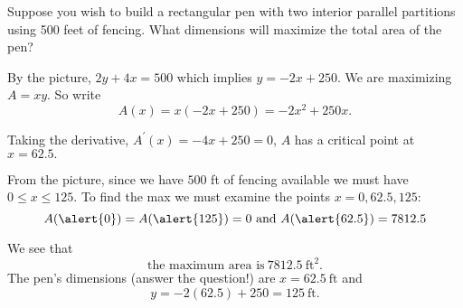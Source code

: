 \documentclass[14pt]{beamer}
\begin{document}
\begin{frame}
\frametitle{}
\small
\begin{exe} Suppose you wish to build a rectangular pen with two interior parallel partitions using 500 feet of fencing.  What dimensions will maximize the total area of the pen?
\begin{center}
\end{center}
\end{exe}
\end{frame}

\begin{frame}
\small
By the picture, $2y+4x=500$ which implies $y=-2x+250$.  We are maximizing $A=xy$.  So write
\[A(x)=x(-2x+250)=-2x^2+250x.\]

Taking the derivative, $A^{\prime}(x)=-4x+250=0$, $A$ has a critical point at $x=62.5.$
\end{frame}

\begin{frame}
\footnotesize
From the picture, since we have $500$ ft of fencing available we must have $0 \le x \le 125$.  To find the max we must examine the points $x=0,62.5,125$:
\[A(\alert{0})=A(\alert{125})=0\text{ and }A(\alert{62.5})=7812.5\]

\vspace{1pc}
We see that 
\[\boxed{\text{the maximum area is}\ 7812.5\ \text{ft}^2.}\]
The pen's dimensions (answer the question!) are $\boxed{x=62.5\ \text{ft}}$ and 
\[\boxed{y=-2(62.5)+250=125\ \text{ft}.}\]
\end{frame}
\end{document}
